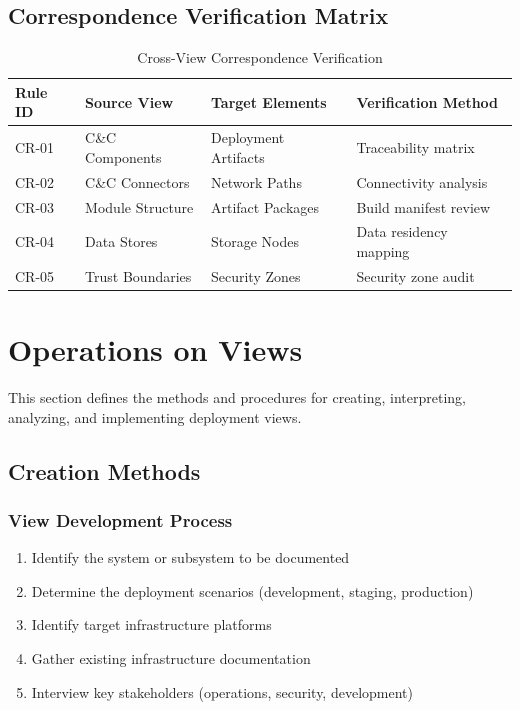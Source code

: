 \documentclass[11pt,letterpaper]{article}
\begin{document}
\subsection{Correspondence Verification Matrix}

\begin{table}[H]
\centering
\caption{Cross-View Correspondence Verification}
\small
\begin{tabular}{@{}L{2.5cm}L{3.5cm}L{3.5cm}L{3.5cm}@{}}
\toprule
\textbf{Rule ID} & \textbf{Source View} & \textbf{Target Elements} & \textbf{Verification Method} \\
\midrule
CR-01 & C\&C Components & Deployment Artifacts & Traceability matrix \\
CR-02 & C\&C Connectors & Network Paths & Connectivity analysis \\
CR-03 & Module Structure & Artifact Packages & Build manifest review \\
CR-04 & Data Stores & Storage Nodes & Data residency mapping \\
CR-05 & Trust Boundaries & Security Zones & Security zone audit \\
\bottomrule
\end{tabular}
\end{table}

\section{Operations on Views}

This section defines the methods and procedures for creating, interpreting, analyzing, and implementing deployment views.

\subsection{Creation Methods}

\subsubsection{View Development Process}

\begin{guidancebox}
\begin{enumerate}[nosep]
    \item Identify the system or subsystem to be documented
    \item Determine the deployment scenarios (development, staging, production)
    \item Identify target infrastructure platforms
    \item Gather existing infrastructure documentation
    \item Interview key stakeholders (operations, security, development)
\end{enumerate}
\end{guidancebox}
\end{document}
